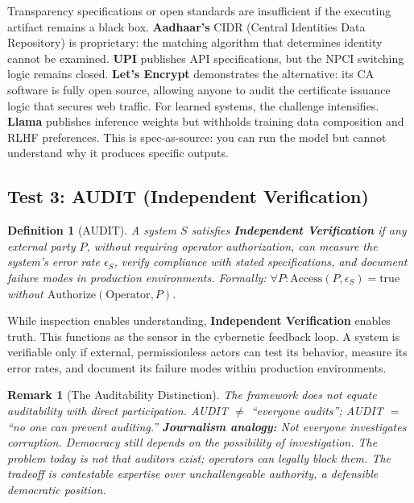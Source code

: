 \documentclass{article}
\newtheorem{definition}{Definition}
\newtheorem{remark}{Remark}
\begin{document}
Transparency specifications or open standards are insufficient if the executing artifact remains a black box. \textbf{Aadhaar's} CIDR (Central Identities Data Repository) is proprietary: the matching algorithm that determines identity cannot be examined. \textbf{UPI} publishes API specifications, but the NPCI switching logic remains closed. \textbf{Let's Encrypt} demonstrates the alternative: its CA software is fully open source, allowing anyone to audit the certificate issuance logic that secures web traffic. For learned systems, the challenge intensifies. \textbf{Llama} publishes inference weights but withholds training data composition and RLHF preferences. This is spec-as-source: you can run the model but cannot understand why it produces specific outputs.

\subsection{Test 3: AUDIT (Independent Verification)}

\begin{definition}[AUDIT]
\label{def:audit}
A system $S$ satisfies \textbf{Independent Verification} if any external party $P$, without requiring operator authorization, can measure the system's error rate $\epsilon_S$, verify compliance with stated specifications, and document failure modes in production environments. Formally: $\forall P: \text{Access}(P, \epsilon_S) = \text{true}$ without $\text{Authorize}(\text{Operator}, P)$.
\end{definition}

While inspection enables understanding, \textbf{Independent Verification} enables truth. This functions as the sensor in the cybernetic feedback loop. A system is verifiable only if external, permissionless actors can test its behavior, measure its error rates, and document its failure modes within production environments.

\begin{remark}[The Auditability Distinction]
The framework does not equate auditability with direct participation. AUDIT $\neq$ ``everyone audits''; AUDIT $=$ ``no one can prevent auditing.'' \textbf{Journalism analogy:} Not everyone investigates corruption. Democracy still depends on the \textit{possibility} of investigation. The problem today is not that auditors exist; operators can legally block them. The tradeoff is contestable expertise over unchallengeable authority, a defensible democratic position.
\end{remark}
\end{document}
